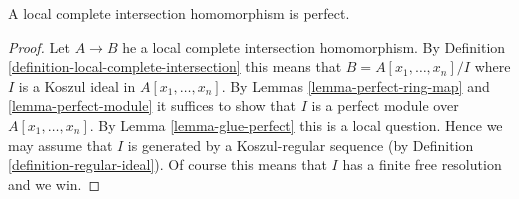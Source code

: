 \begin{lemma}
\label{lemma-lci-perfect}
A local complete intersection homomorphism is perfect.
\end{lemma}

\begin{proof}
Let $A \to B$ he a local complete intersection homomorphism.
By Definition \ref{definition-local-complete-intersection} this
means that $B = A[x_1, \ldots, x_n]/I$ where $I$ is a Koszul ideal
in $A[x_1, \ldots, x_n]$. 
By Lemmas \ref{lemma-perfect-ring-map} and \ref{lemma-perfect-module}
it suffices to show that $I$ is a perfect module over $A[x_1, \ldots, x_n]$.
By Lemma \ref{lemma-glue-perfect} this is a local question. Hence we
may assume that $I$ is generated by a Koszul-regular sequence (by
Definition \ref{definition-regular-ideal}).
Of course this means that $I$ has a finite free resolution and we win.
\end{proof}
















